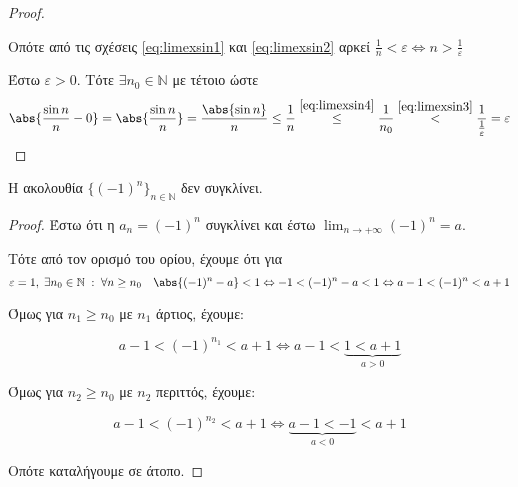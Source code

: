 \documentclass[main.tex]{subfiles}
\begin{document}
\begin{examples}
\begin{enumerate}[i)]
\begin{proof}
\begin{description}
                        Οπότε από τις σχέσεις \eqref{eq:limexsin1} και 
                        \eqref{eq:limexsin2} αρκεί $ \frac{1}{n} < 
                        \varepsilon \Leftrightarrow n > \frac{1}{
                        \varepsilon} $
                \end{description}

                Έστω $ \varepsilon >0 $. Τότε $ \exists n_{0} \in \mathbb{N}
                $ με  τέτοιο ώστε
                \[
                    \abs{\frac{\sin{n}}{n} - 0} =  \abs{\frac{\sin{n}}{n}} =
                    \frac{\abs{\sin{n}}}{n} \leq \frac{1}{n}
                    \overset{\eqref{eq:limexsin4}}{\leq}  \frac{1}{n_{0}}
                    \overset{\eqref{eq:limexsin3}}{<}
                    \frac{1}{\frac{1}{\varepsilon}
                    } = \varepsilon 
                \] 
            \end{proof}
    \end{enumerate}
\end{examples}

\begin{prop}
    Η ακολουθία $ \{ (-1)^{n} \}_{n \in \mathbb{N}} $ δεν συγκλίνει.
\end{prop}

\begin{proof}
\item {}
    Έστω ότι η $ a_{n}= (-1)^{n} $ συγκλίνει και έστω $ \lim_{n \to +
    \infty}(-1)^{n} = a $. 

    Τότε από τον ορισμό του ορίου, έχουμε ότι για 
    \[ 
        \varepsilon = 1, \; \exists n_{0} \in \mathbb{N} \; : \; \forall 
        n \geq n_{0} \quad \abs{(-1)^{n}-a} < 1 \Leftrightarrow -1 < 
        (-1)^{n} -a < 1 \Leftrightarrow a-1 < (-1)^{n} < a+1
    \]

    Όμως για $ n_{1} \geq n_{0} $ με $ n_{1} $ άρτιος, έχουμε:

    \[
        a-1 <  (-1)^{n_{1}} < a+1 \Leftrightarrow a-1 < 
        \underbrace{1 < a+1}_{a>0} 
    \] 

    Όμως για $ n_{2} \geq n_{0} $ με $ n_{2} $ περιττός, έχουμε:

    \[
        a-1 <  (-1)^{n_{2}} < a+1 \Leftrightarrow 
        \underbrace{a-1 < -1}_{a<0} < a+1
    \] 

    Οπότε καταλήγουμε σε άτοπο.
\end{proof}
\end{document}
